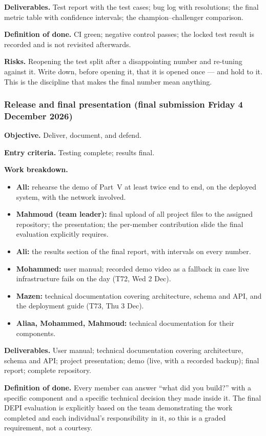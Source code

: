 \documentclass[11pt,a4paper]{article}
\begin{document}
\textbf{Deliverables.} Test report with the test cases; bug log with resolutions; the final metric
table with confidence intervals; the champion--challenger comparison.

\textbf{Definition of done.} CI green; negative control passes; the locked test result is recorded
and is not revisited afterwards.

\textbf{Risks.} Reopening the test split after a disappointing number and re-tuning against it.
Write down, before opening it, that it is opened once --- and hold to it. This is the discipline
that makes the final number mean anything.

\subsubsection*{Release and final presentation (final submission Friday 4 December 2026)}

\textbf{Objective.} Deliver, document, and defend.

\textbf{Entry criteria.} Testing complete; results final.

\textbf{Work breakdown.}
\begin{itemize}
\item \textbf{All:} rehearse the demo of Part~V at least twice end to end, on the deployed system,
with the network involved.
\item \textbf{Mahmoud (team leader):} final upload of all project files to the assigned repository; the
presentation; the per-member contribution slide the final evaluation explicitly requires.
\item \textbf{Ali:} the results section of the final report, with intervals on every number.
\item \textbf{Mohammed:} user manual; recorded demo video as a fallback in case live infrastructure
fails on the day (T72, Wed 2 Dec).
\item \textbf{Mazen:} technical documentation covering architecture, schema and API, and the
deployment guide (T73, Thu 3 Dec).
\item \textbf{Aliaa, Mohammed, Mahmoud:} technical documentation for their components.
\end{itemize}

\textbf{Deliverables.} User manual; technical documentation covering architecture, schema and API;
project presentation; demo (live, with a recorded backup); final report; complete repository.

\textbf{Definition of done.} Every member can answer ``what did you build?'' with a specific
component and a specific technical decision they made inside it. The final DEPI evaluation is
explicitly based on the team demonstrating the work completed and each individual's responsibility
in it, so this is a graded requirement, not a courtesy.
\end{document}
